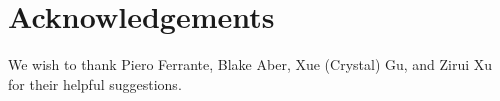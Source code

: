 \documentclass[
]{article}
\begin{document}
\section*{Acknowledgements}
We wish to thank Piero Ferrante, Blake Aber, Xue (Crystal) Gu, and Zirui Xu for their helpful suggestions.



\end{document}

